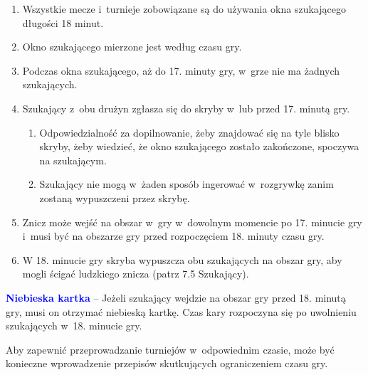 \documentclass[12pt,a4paper]{article}
\renewcommand{\paragraph}[1]{
  \oldparagraph{#1}%
  \leftskip2.8cm
}
\newcommand\bluecard[1]{\bgroup\textcolor{blue}{\textbf{#1}}}
\begin{document}
\begin{enumerate}
	\item Wszystkie mecze i~turnieje zobowiązane są do używania okna
	      szukającego długości 18 minut.

	\item Okno szukającego mierzone jest według czasu gry.

	\item Podczas okna szukającego, aż do 17. minuty gry, w~grze nie ma żadnych
	      szukających.

	\item Szukający z~obu drużyn zgłasza się do skryby w~lub przed 17. minutą
	      gry.
	      \begin{enumerate}
		      \item Odpowiedzialność za dopilnowanie, żeby znajdować się na tyle blisko
		            skryby, żeby wiedzieć, że okno szukającego zostało zakończone, spoczywa
		            na szukającym.

		      \item Szukający nie mogą w~żaden sposób ingerować w~rozgrywkę zanim
		            zostaną wypuszczeni przez skrybę.
	      \end{enumerate}

	\item Znicz może wejść na obszar w~gry w~dowolnym momencie po 17. minucie
	      gry i~musi być na obszarze gry przed rozpoczęciem 18. minuty czasu gry.

	\item W 18. minucie gry skryba wypuszcza obu szukających na obszar gry, aby
	      mogli ścigać ludzkiego znicza (patrz 7.5 Szukający).
\end{enumerate}

\bluecard{Niebieska kartka} -- Jeżeli szukający wejdzie na obszar gry przed
18. minutą gry, musi on otrzymać niebieską kartkę. Czas kary rozpoczyna
się po uwolnieniu szukających w~18. minucie gry.

\paragraph{Regulowanie długości gry}
Aby zapewnić
przeprowadzanie turniejów w~odpowiednim czasie, może być konieczne
wprowadzenie przepisów skutkujących ograniczeniem czasu gry.
\end{document}
